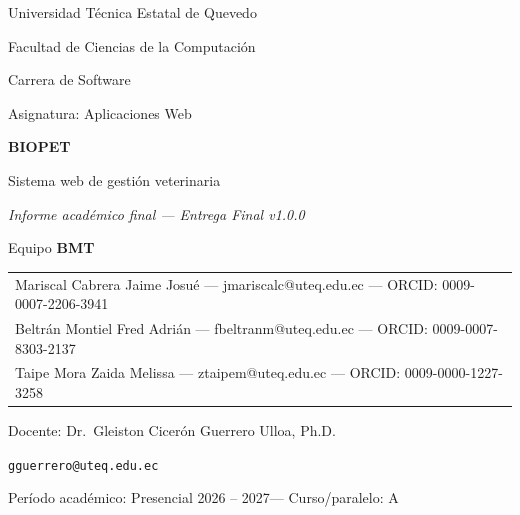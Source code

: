 \documentclass[12pt,a4paper]{report}
\makeatletter
\newcommand{\universidad}{Universidad T\'ecnica Estatal de Quevedo}
\newcommand{\facultad}{Facultad de Ciencias de la Computaci\'on}
\newcommand{\carrera}{Carrera de Software}
\newcommand{\asignatura}{Aplicaciones Web}
\newcommand{\docente}{Dr.\ Gleiston Cicer\'on Guerrero Ulloa, Ph.D.}
\newcommand{\correodocente}{gguerrero@uteq.edu.ec}
\newcommand{\periodoacademico}{Presencial 2026 -- 2027}
\newcommand{\cursoparalelo}{A}
\newcommand{\equipo}{BMT}
\newcommand{\orcidjaime}{0009-0007-2206-3941}
\newcommand{\orcidfred}{0009-0007-8303-2137}
\newcommand{\orcidzaida}{0009-0000-1227-3258}
\makeatother
\begin{document}

\begin{titlepage}
  \centering
  \vspace*{0.3cm}

  {\large \universidad \par}
  {\large \facultad \par}
  \vspace{0.3cm}
  {\normalsize \carrera \par}
  {\normalsize Asignatura: \asignatura \par}

  \vspace{1.6cm}
  {\Huge \bfseries BIOPET \par}
  \vspace{0.4cm}
  {\Large Sistema web de gesti\'on veterinaria \par}
  \vspace{0.6cm}
  {\Large\itshape Informe acad\'emico final --- Entrega Final v1.0.0 \par}

  \vspace{1.6cm}
  {\large Equipo \textbf{\equipo} \par}
  \vspace{0.6cm}

  {\normalsize
    \begin{tabular}{>{\centering\arraybackslash}p{15cm}}
      Mariscal Cabrera Jaime Josu\'e \quad --- \quad jmariscalc@\allowbreak uteq.edu.ec \quad --- \quad ORCID: \orcidjaime \\
      Beltr\'an Montiel Fred Adri\'an \quad --- \quad fbeltranm@\allowbreak uteq.edu.ec \quad --- \quad ORCID: \orcidfred \\
      Taipe Mora Zaida Melissa \quad --- \quad ztaipem@\allowbreak uteq.edu.ec \quad --- \quad ORCID: \orcidzaida \\
    \end{tabular}
    \par
  }

  \vspace{1.4cm}
  {\normalsize Docente: \docente \par}
  {\normalsize \texttt{\correodocente} \par}
  \vspace{0.3cm}
  {\normalsize Per\'iodo acad\'emico: \periodoacademico \quad --- \quad Curso/paralelo: \cursoparalelo \par}


\end{titlepage}
\end{document}
